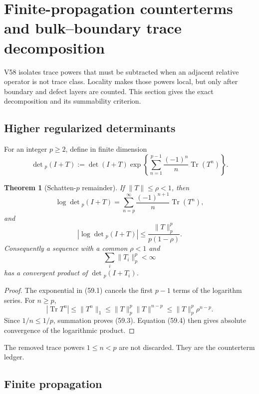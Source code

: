\documentclass[11pt]{article}
\newtheorem{theorem}{Theorem}[section]
\begin{document}
\section{Finite-propagation counterterms and bulk--boundary trace
decomposition}
\label{sec:v11v59}

V58 isolates trace powers that must be subtracted when an adjacent
relative operator is not trace class.  Locality makes those powers
local, but only after boundary and defect layers are counted.  This
section gives the exact decomposition and its summability criterion.

\subsection{Higher regularized determinants}

For an integer \(p\ge2\), define in finite dimension
\[
 \det{}_p(I+T)
 :=\det(I+T)
   \exp\left\{\sum_{n=1}^{p-1}
                    \frac{(-1)^n}{n}\operatorname{Tr}(T^n)\right\}.
                                                                  \tag{59.1}
\]

\begin{theorem}[Schatten-\(p\) remainder]
\label{thm:v11v59-detp}
If \(\lVert T\rVert\le\rho<1\), then
\[
 \log\det{}_p(I+T)
 =\sum_{n=p}^{\infty}
       \frac{(-1)^{n+1}}n\operatorname{Tr}(T^n),              \tag{59.2}
\]
and
\[
 \left|\log\det{}_p(I+T)\right|
 \le\frac{\lVert T\rVert_p^p}{p(1-\rho)}.                    \tag{59.3}
\]
Consequently a sequence with a common \(\rho<1\) and
\[
                              \sum_i\lVert T_i\rVert_p^p<\infty\tag{59.4}
\]
has a convergent product of \(\det{}_p(I+T_i)\).
\end{theorem}

\begin{proof}
The exponential in (59.1) cancels the first \(p-1\) terms of the
logarithm series.  For \(n\ge p\),
\[
 |\operatorname{Tr}T^n|
 \le\lVert T^n\rVert_1
 \le\lVert T\rVert_p^p\lVert T\rVert^{n-p}
 \le\lVert T\rVert_p^p\rho^{n-p}.
\]
Since \(1/n\le1/p\), summation proves (59.3).  Equation (59.4) then
gives absolute convergence of the logarithmic product.
\end{proof}

The removed trace powers \(1\le n<p\) are not discarded.  They are
the counterterm ledger.

\subsection{Finite propagation}
\end{document}
